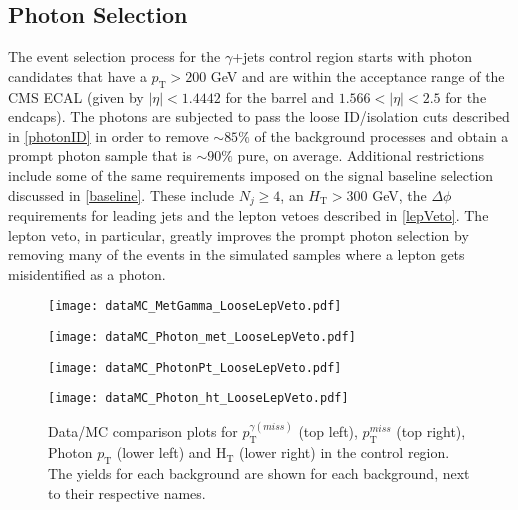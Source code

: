 \subsection{Photon Selection}
The event selection process for the $\gamma$+jets control region starts with photon candidates that have a $p_\text{T} > 200$ GeV and are within the acceptance range of the CMS ECAL (given by $|\eta| < 1.4442$ for the barrel and $1.566 < |\eta| < 2.5$ for the endcaps). The photons are subjected to pass the loose ID/isolation cuts described in \autoref{photonID} in order to remove $\sim85\%$ of the background processes and obtain a prompt photon sample that is $\sim90\%$ pure, on average. Additional restrictions include some of the same requirements imposed on the signal baseline selection discussed in \autoref{baseline}. These include $N_j \geq 4$, an $H_\text{T} > 300$ GeV, the $\Delta\phi$ requirements for leading jets and the lepton vetoes described in \autoref{lepVeto}. The lepton veto, in particular, greatly improves the prompt photon selection by removing many of the events in the simulated samples where a lepton gets misidentified as a photon.\\

\begin{figure}[tb]
\begin{center}
\begin{minipage}[b]{0.45\textwidth}
    \texttt{[image: dataMC\_MetGamma\_LooseLepVeto.pdf]}
\end{minipage}
\begin{minipage}[b]{0.45\textwidth}
    \texttt{[image: dataMC\_Photon\_met\_LooseLepVeto.pdf]}
\end{minipage}
\end{center}
\begin{center}
\begin{minipage}[b]{0.45\textwidth}
    \texttt{[image: dataMC\_PhotonPt\_LooseLepVeto.pdf]}
\end{minipage}
\begin{minipage}[b]{0.45\textwidth}
    \texttt{[image: dataMC\_Photon\_ht\_LooseLepVeto.pdf]}
\end{minipage}
\end{center}
\vspace{-1.5em}
\caption{Data/MC comparison plots for $p_\text{T}^{\gamma(miss)}$ (top left), $p_\text{T}^{miss}$ (top right), Photon $p_\text{T}$ (lower left) and H$_\text{T}$ (lower right) in the control region. The yields for each background are shown for each background, next to their respective names.}
\label{dataMCpho}
\end{figure}

